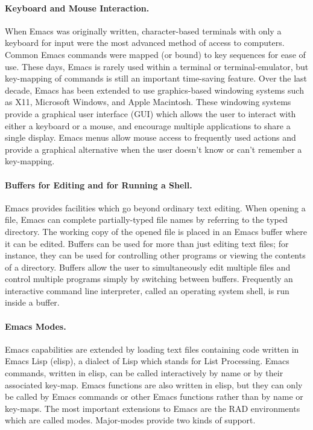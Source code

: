 \documentclass{article}
\begin{document}
\paragraph{Keyboard and Mouse Interaction.}
When Emacs was originally written, character-based terminals with only
a keyboard for input were the most advanced method of access to
computers.  Common Emacs commands were mapped (or bound) to key
sequences for ease of use.  These days, Emacs is
rarely used within a terminal or terminal-emulator, but key-mapping of
commands is still an important time-saving feature.  Over the last
decade, Emacs has been extended to use graphics-based windowing
systems such as X11, Microsoft Windows, and Apple Macintosh.  These
windowing systems provide a graphical user interface (GUI) which
allows the user to interact with either a keyboard or a mouse, and 
encourage multiple applications to share a single display.  Emacs 
menus allow mouse access to frequently used actions and provide a 
graphical alternative when the user doesn't know or can't remember 
a key-mapping.  

\paragraph{Buffers for Editing and for Running a Shell.}
Emacs provides facilities which go beyond ordinary text editing.  When
opening a file, Emacs can complete partially-typed file names by
referring to the typed directory.  The working copy of the opened file 
is placed in an Emacs buffer where it can be edited.  Buffers can be 
used for more than just editing text files; for instance, they can be 
used for controlling other programs or viewing the contents of a directory.  
Buffers allow the user to simultaneously edit multiple files and control 
multiple programs simply by switching between buffers.  Frequently an 
interactive command line interpreter, called an operating system shell, 
is run inside a buffer.

\paragraph{Emacs Modes.}
Emacs capabilities are extended by loading text files containing code
written in Emacs Lisp (elisp), a dialect of Lisp
which stands for List Processing.  Emacs commands, 
written in elisp, can be called interactively by name or by their associated 
key-map.  Emacs functions are also written in elisp, but they can only be 
called by Emacs commands or other Emacs functions rather than by
name or key-maps.  The most important extensions to Emacs are the RAD
environments which are called modes.  Major-modes provide two kinds of support.  
\end{document}
